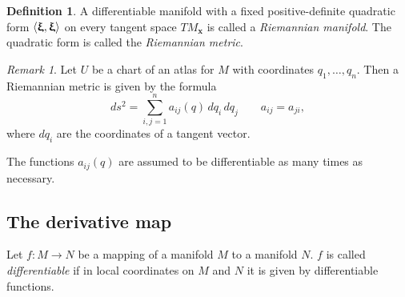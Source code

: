 \documentclass[leqno]{book}
\renewcommand{\pmb}[1]{{
  \renewcommand{\alpha}{\upalpha}
  \renewcommand{\beta}{\upbeta}
  \renewcommand{\gamma}{\upgamma}
  \renewcommand{\delta}{\updelta}
  \renewcommand{\epsilon}{\upepsilon}
  \renewcommand{\varepsilon}{\upvarepsilon}
  \renewcommand{\zeta}{\upzeta}
  \renewcommand{\eta}{\upeta}
  \renewcommand{\theta}{\uptheta}
  \renewcommand{\iota}{\upiota}
  \renewcommand{\kappa}{\upkappa}
  \renewcommand{\lambda}{\uplambda}
  \renewcommand{\mu}{\upmu}
  \renewcommand{\nu}{\upnu}
  \renewcommand{\xi}{\upxi}
  \renewcommand{\pi}{\uppi}
  \renewcommand{\rho}{\uprho}
  \renewcommand{\sigma}{\upsigma}
  \renewcommand{\tau}{\uptau}
  \renewcommand{\upsilon}{\upupsilon}
  \renewcommand{\varphi}{\upvarphi}
  \renewcommand{\phi}{\upphi}
  \renewcommand{\chi}{\upchi}
  \renewcommand{\psi}{\uppsi}
  \renewcommand{\omega}{\upomega}
  \boldsymbol{#1}
}}
\numberwithin{equation}{section}
\theoremstyle{plain}
\theoremstyle{definition}
\newtheorem*{defn*}{Definition}
\theoremstyle{remark}
\newtheorem*{rem*}{Remark}
\theoremstyle{smallcap}
\numberwithin{prob}{section}
\begin{document}
\begin{defn*}
  A differentiable manifold with a fixed positive-definite
  quadratic form $\langle \pmb\xi, \pmb\xi \rangle$
  on every tangent space $TM_\mathbf{x}$
  is called a \emph{Riemannian manifold}.
  The quadratic form is called the \emph{Riemannian metric}.
\end{defn*}

\begin{rem*}
  Let $U$ be a chart of an atlas for $M$ with coordinates
  $q_1, \dots, q_n$.
  Then a Riemannian metric is given by the formula
  $$
  ds^2 = \sum_{i,j=1}^n a_{ij}(q) \, dq_i \, dq_j
  \qquad
  a_{ij} = a_{ji},
  $$
  where $dq_i$ are the coordinates of a tangent vector.

  The functions $a_{ij}(q)$ are assumed to be
  differentiable as many times as necessary.
\end{rem*}


\subsection{The derivative map}

Let $f: M \rightarrow N$ be a mapping of a manifold $M$ to a manifold $N$.
%
$f$ is called \emph{differentiable} if in local coordinates on $M$ and $N$
it is given by differentiable functions.
\end{document}
